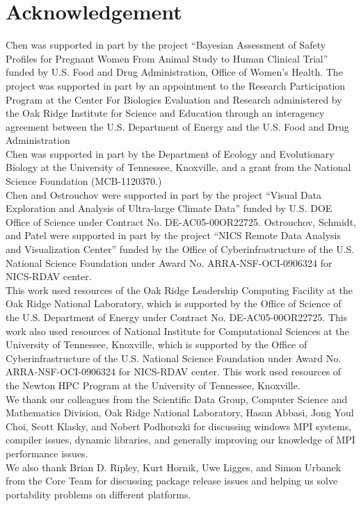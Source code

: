 
\section*{Acknowledgement}

Chen was supported in part by the project
``Bayesian Assessment of Safety Profiles for Pregnant Women From Animal
Study to Human Clinical Trial'' funded by U.S. Food and Drug Administration,
Office of Women's Health. The project was supported
in part by an appointment to the Research Participation Program at the
Center For Biologics Evaluation and Research administered by the Oak Ridge
Institute for Science and Education through an interagency agreement between
the U.S. Department of Energy and the U.S. Food and Drug Administration
\\

Chen was supported in part by
the Department of Ecology and Evolutionary Biology at the
University of Tennessee, Knoxville, and a grant from
the National Science Foundation (MCB-1120370.)
\\

Chen and Ostrouchov were supported in part by the project
``Visual Data Exploration and Analysis of Ultra-large Climate Data''
funded by U.S. DOE Office of Science
under Contract No. DE-AC05-00OR22725.
Ostrouchov, Schmidt, and Patel were supported in part by the project
``NICS Remote Data Analysis and Visualization Center''
funded by the Office of Cyberinfrastructure of the
U.S. National Science Foundation
under Award No. ARRA-NSF-OCI-0906324 for NICS-RDAV center.
\\

This work used resources of the Oak Ridge Leadership Computing Facility at the
Oak Ridge National Laboratory, which is supported by the Office of Science
of the U.S. Department of Energy under Contract No. DE-AC05-00OR22725.
This work also used resources of National Institute for Computational
Sciences at the University of Tennessee, Knoxville, which is supported
by the Office of Cyberinfrastructure of the U.S. National Science Foundation
under Award No. ARRA-NSF-OCI-0906324 for NICS-RDAV center.
This work used resources of the Newton HPC Program at the University of
Tennessee, Knoxville.
\\

We thank our colleagues from the Scientific Data Group, Computer
Science and Mathematics Division, Oak Ridge National Laboratory,
Hasan Abbasi, Jong Youl Choi, Scott Klasky, and Nobert
Podhorszki for discussing windows MPI systems, compiler issues,
dynamic libraries, and generally improving our knowledge of MPI
performance issues.
\\

We also thank Brian D. Ripley, Kurt Hornik, Uwe Ligges, and Simon Urbanek
from the  Core Team for discussing package release issues and
helping us solve portability problems on different platforms.
\\
